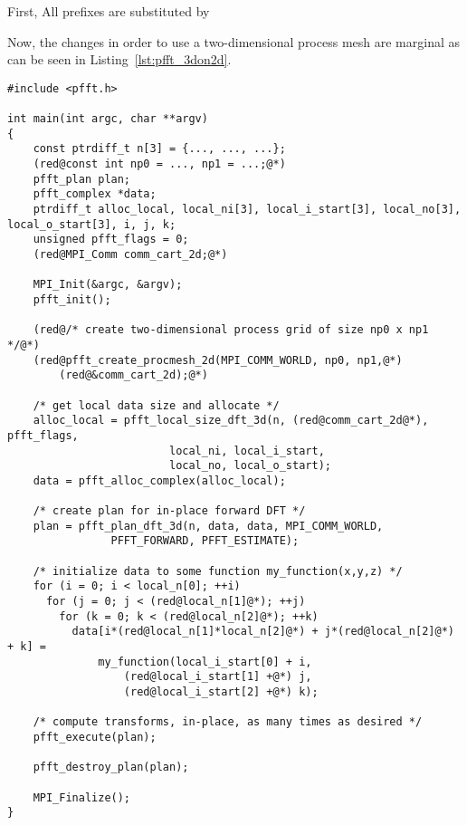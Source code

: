 First, All prefixes  are substituted by 

Now, the changes in order to use a two-dimensional process mesh are marginal as can be seen in Listing~\ref{lst:pfft_3don2d}.
\begin{lstlisting}
#include <pfft.h>
     
int main(int argc, char **argv)
{
    const ptrdiff_t n[3] = {..., ..., ...};
    (red@const int np0 = ..., np1 = ...;@*)
    pfft_plan plan;
    pfft_complex *data;
    ptrdiff_t alloc_local, local_ni[3], local_i_start[3], local_no[3], local_o_start[3], i, j, k;
    unsigned pfft_flags = 0;
    (red@MPI_Comm comm_cart_2d;@*)

    MPI_Init(&argc, &argv);
    pfft_init();

    (red@/* create two-dimensional process grid of size np0 x np1 */@*)
    (red@pfft_create_procmesh_2d(MPI_COMM_WORLD, np0, np1,@*)
        (red@&comm_cart_2d);@*)
    
    /* get local data size and allocate */
    alloc_local = pfft_local_size_dft_3d(n, (red@comm_cart_2d@*), pfft_flags,
				         local_ni, local_i_start,
				         local_no, local_o_start);
    data = pfft_alloc_complex(alloc_local);

    /* create plan for in-place forward DFT */
    plan = pfft_plan_dft_3d(n, data, data, MPI_COMM_WORLD,
			    PFFT_FORWARD, PFFT_ESTIMATE);

    /* initialize data to some function my_function(x,y,z) */
    for (i = 0; i < local_n[0]; ++i) 
      for (j = 0; j < (red@local_n[1]@*); ++j) 
        for (k = 0; k < (red@local_n[2]@*); ++k)
          data[i*(red@local_n[1]*local_n[2]@*) + j*(red@local_n[2]@*) + k] =
              my_function(local_i_start[0] + i,
		          (red@local_i_start[1] +@*) j,
		          (red@local_i_start[2] +@*) k);

    /* compute transforms, in-place, as many times as desired */
    pfft_execute(plan);

    pfft_destroy_plan(plan);

    MPI_Finalize();
}
\end{lstlisting}







